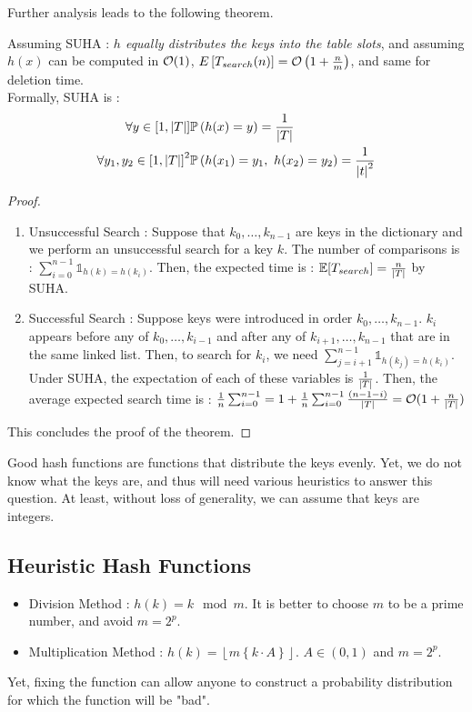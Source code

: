 \documentclass{cours}
\begin{document}
Further analysis leads to the following theorem. 
\begin{theorem}
    Assuming SUHA : \og \textit{$h$ equally distributes the keys into the table slots}\fg, and assuming $h(x)$ can be computed in $\mathcal{O}(1)$, $E\left[T_{search}(n)\right] = \mathcal{O}\left(1 + \frac{n}{m}\right)$, and same for deletion time. \\
    Formally, SUHA is : 
    \[
        \begin{aligned}
            \forall y \in \left[1, \left|T\right|\right] & \mathbb{P}\left(h(x) = y\right) = \frac{1}{\left|T\right|}\\
            \forall y_{1}, y_{2} \in \left[1, \left|T\right|\right]^{2} & \mathbb{P}\left(h(x_{1}) = y_{1},\ h(x_{2}) = y_{2}\right) = \frac{1}{\left|t\right|^{2}}
        \end{aligned}    
    \]
\end{theorem}
\begin{proof}
    \begin{enumerate}
        \item Unsuccessful Search : Suppose that $k_{0}, \ldots, k_{n-1}$ are keys in the dictionary and we perform an unsuccessful search for a key $k$.
        The number of comparisons is : $\sum_{i = 0}^{n-1} \mathds{1}_{h(k) = h(k_{i})}$. Then, the expected time is : $\mathbb{E}[T_{search}] = \frac{n}{\left|T\right|}$ by SUHA.
        \item Successful Search : Suppose keys were introduced in order $k_{0}, \ldots, k_{n-1}$. $k_{i}$ appears before any of $k_{0}, \ldots, k_{i-1}$ and after any of $k_{i+1}, \ldots, k_{n-1}$ that are in the same linked list. Then, to search for $k_{i}$, we need $\sum_{j = i + 1}^{n- 1} \mathds{1}_{h(k_{j}) = h(k_{i})}$. Under SUHA, the expectation of each of these variables is $\frac{1}{\left|T\right|}$. Then, the average expected search time is : $\frac{1}{n}\sum_{i = 0}^{n-1} = 1 + \frac{1}{n}\sum_{i = 0}^{n-1}\frac{(n-1-i)}{\left|T\right|} = \mathcal{O}(1 + \frac{n}{\left|T\right|})$
    \end{enumerate}
    This concludes the proof of the theorem. 
\end{proof}

Good hash functions are functions that distribute the keys evenly. Yet, we do not know what the keys are, and thus will need various heuristics to answer this question. At least, without loss of generality, we can assume that keys are integers.

\subsection{Heuristic Hash Functions}
    \begin{itemize}
        \item Division Method : $h(k) = k \mod m$. It is better to choose $m$ to be a prime number, and avoid $m = 2^{p}$.
        \item Multiplication Method : $h(k) = \left\lfloor m \left\{k\cdot A\right\}\right\rfloor$. $A \in (0, 1)$ and $m = 2^{p}$.
    \end{itemize}
Yet, fixing the function can allow anyone to construct a probability distribution for which the function will be "bad".
\end{document}
